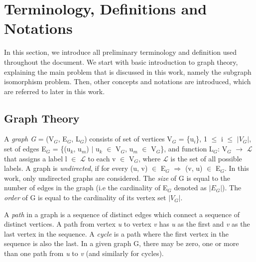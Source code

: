 \documentclass{l4proj}
\newcommand{\Lagr}{\mathcal{L}}
\begin{document}
        

\section{Terminology, Definitions and Notations}
\label{sec:theory}
In this section, we introduce all preliminary terminology and definition used throughout the document. We start with basic introduction to graph theory, explaining the main problem that is discussed in this work, namely the subgraph isomorphism problem. Then, other concepts and notations are introduced, which are referred to later in this work.

\subsection{Graph Theory}
\label{sec:graphTheory}

A \emph{graph G} = (V$_{G}$, E$_{G}$, L$_{G}$) consists of set of vertices V$_{G}$ = \{u$_i$\}, 1 $\leq$ i $\leq$ $|V_{G}|$, set of edges E$_{G}$ = \{(u$_k$, u$_m$) $|$ u$_k$ $\in$ V$_{G}$, u$_m$ $\in$ V$_{G}$\}, and  function  L$_{G}$: V$_{G}$ $\rightarrow$ $\Lagr$ that assigns a label l $\in$ $\Lagr$ to each v $\in$ V$_{G}$, where $\Lagr$ is the set of all possible labels. A graph is \emph{undirected}, if for every (u, v) $\in$ E$_{G}$ $\Rightarrow$ (v, u) $\in$ E$_{G}$. In this work, only undirected graphs are considered. The \emph{size} of G is equal to the number of edges in the graph (i.e the cardinality of E$_{G}$ denoted as $|E_{G}|$). The \emph{order} of G is equal to the cardinality of its vertex set $|V_{G}|$.

A \emph{path} in a graph is a sequence of distinct edges which connect a sequence of distinct vertices. A path from vertex \emph{u} to vertex \emph{v} has \emph{u} as the first and \emph{v} as the last vertex in the sequence. A \emph{cycle} is a path where the first vertex in the sequence is also the last. In a given graph G, there may be zero, one or more than one path from \emph{u} to \emph{v} (and similarly for cycles).
\end{document}

